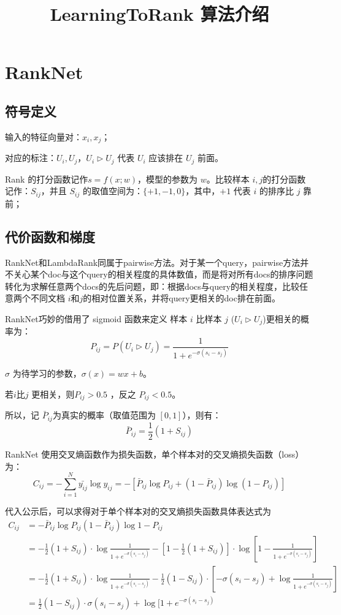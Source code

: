 \documentclass[12pt]{article}
\title{LearningToRank 算法介绍}
\begin{document}
\maketitle

\section{RankNet\cite{From_RankNet_To_LambdaRank_To_LambdaMART}\cite{About_RankNet_LambdaRank}}
\subsection{符号定义}
输入的特征向量对：$x_i, x_j$；

对应的标注：$U_i, U_j$，$U_i \rhd U_j$ 代表 $U_i$ 应该排在 $U_j$ 前面。

Rank 的打分函数记作$s = f(x;w)$，模型的参数为 $w$。比较样本 $i,j$的打分函数记作：$S_{ij}$，并且 $S_{ij}$ 的取值空间为：$\{+1, -1, 0\}$，其中，$+1$ 代表 $i$ 的排序比 $j$ 靠前；

\subsection{代价函数和梯度}
RankNet和LambdaRank同属于pairwise方法。对于某一个query，pairwise方法并不关心某个doc与这个query的相关程度的具体数值，而是将对所有docs的排序问题转化为求解任意两个docs的先后问题，即：根据docs与query的相关程度，比较任意两个不同文档 $i$和$j$的相对位置关系，并将query更相关的doc排在前面。

RankNet巧妙的借用了 sigmoid 函数来定义 样本 $i$ 比样本 $j$ ($U_i \rhd U_j$)更相关的概率为：
$$
P_{ij} = P(U_i \rhd U_j) = \frac{1}{1 + e^{-\sigma(s_i - s_j)}}
$$

$\sigma$ 为待学习的参数，$\sigma(x) = wx+b$。

若$i$比$j$ 更相关，则$P_{ij} > 0.5$ ，反之 $P_{ij} < 0.5$。

所以，记 $\bar P_{ij}$为真实的概率（取值范围为 $[0,1]$），则有：
$$
\bar P_{ij} = \frac{1}{2}(1 + S_{ij})
$$

RankNet 使用交叉熵函数作为损失函数，单个样本对的交叉熵损失函数（loss）为：
$$
C_{ij} = -\sum_{i=1}^N\bar{y_{ij}}\log{y_{ij}} = -[\bar P_{ij}\log{P_{ij}} + (1-\bar P_{ij})\log{(1 - P_{ij})}]
$$

代入公示后，可以求得对于单个样本对的交叉熵损失函数具体表达式为
\begin{align}
C_{ij} &= -\bar P_{ij}\log{P_{ij}}  (1-\bar P_{ij})\log{1 - P_{ij}} \\
    &= -\frac{1}{2}(1+S_{ij})\cdot\log\frac{1}{1 + e^{-\sigma(s_i - s_j)}} - [1 - \frac{1}{2}(1+S_{ij})]\cdot\log{[1-\frac{1}{1 + e^{-\sigma(s_i - s_j)}}]} \\
    &= -\frac{1}{2}(1+S_{ij})\cdot\log\frac{1}{1 + e^{-\sigma(s_i - s_j)}} - \frac{1}{2}(1-S_{ij})\cdot[-\sigma(s_i-s_j)+\log{\frac{1}{1+e^{-\sigma(s_i-s_j)}}}] \\
    &= \frac{1}{2}(1-S_{ij})\cdot\sigma(s_i - s_j)+\log[1+e^{-\sigma(s_i-s_j)}
\end{align}
\end{document}
